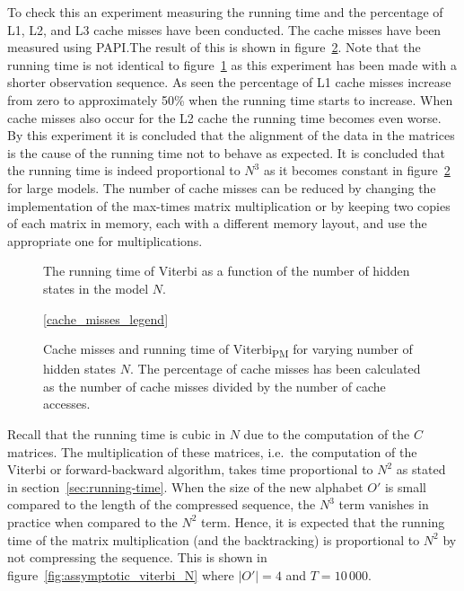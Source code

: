 To check this an experiment measuring the running time and the percentage of
L1, L2, and L3 cache misses have been conducted. The cache misses have been
measured using PAPI.\@ The result of this is shown in
figure~\ref{fig:cache-misses}. Note that the running time is not identical to
figure~\ref{fig:assymptotic_viterbi_backtrack_N} as this experiment has been
made with a shorter observation sequence. As seen the percentage of L1 cache
misses increase from zero to approximately 50\% when the running time starts to
increase. When cache misses also occur for the L2 cache the running time
becomes even worse. By this experiment it is concluded that the alignment of
the data in the matrices is the cause of the running time not to behave as
expected. It is concluded that the running time is indeed proportional to $N^3$
as it becomes constant in figure~\ref{fig:cache-misses} for
large models. The number of cache misses can be reduced by changing the
implementation of the max-times matrix multiplication or by keeping two copies
of each matrix in memory, each with a different memory layout, and use the
appropriate one for multiplications.

\begin{figure}
  \centering
  
  \caption{The running time of Viterbi as a function of the number of hidden
    states in the model $N$.}
  \label{fig:assymptotic_viterbi_backtrack_N}
\end{figure}

\begin{figure}
  \centering\ref{cache_misses_legend}\\
  
  \caption{Cache misses and running time of Viterbi\textsubscript{PM} for
    varying number of hidden states $N$. The percentage of cache misses has been
    calculated as the number of cache misses divided by the number of cache
    accesses.}
  \label{fig:cache-misses}
\end{figure}

Recall that the running time is cubic in $N$ due to the computation of the
$C$ matrices. The multiplication of these matrices, i.e.\ the computation
of the Viterbi or forward-backward algorithm, takes time
proportional to $N^2$ as stated in section~\ref{sec:running-time}. When the
size of the new alphabet $O'$ is small compared to the length of the compressed
sequence, the $N^3$ term vanishes in practice when compared to the $N^2$
term. Hence, it is expected that the running time of the matrix multiplication
(and the backtracking) is proportional to $N^2$ by not compressing the
sequence. This is shown in figure~\ref{fig:assymptotic_viterbi_N} where
$\lvert O' \rvert = 4$ and $T = 10\,000$.

